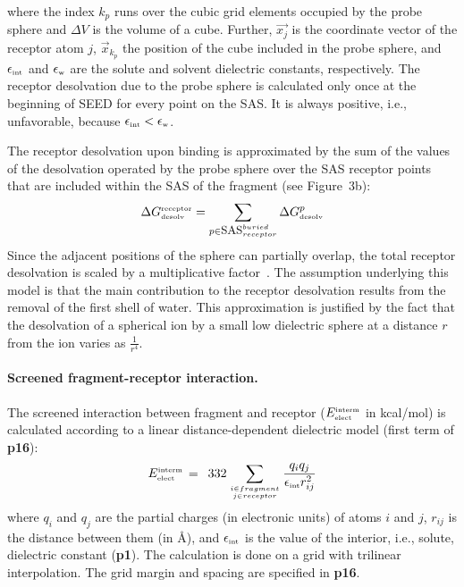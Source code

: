 \documentclass[a4paper,12pt,titlepage]{article}
\begin{document}
%
where the index $k_p$ runs over the cubic grid elements occupied by the probe
sphere and $\Delta V$ is the volume of a cube.  
Further, $\vec{x_j}$ is the coordinate vector of the receptor atom $j$,
$\vec{x}_{k_p}$ the position of the cube included in the probe sphere,
and $\epsilon_{\mbox{\tiny int}}$ and ${\epsilon_{\mbox {\tiny w}}}$ 
are the solute and
solvent dielectric constants, respectively.
The receptor desolvation due to the probe sphere is calculated only once 
at the beginning of SEED for every point on the SAS.  It is always
positive, i.e., unfavorable, because $\epsilon_{\mbox{\tiny int}} 
< {\epsilon_{\mbox {\tiny w}}}$.

The receptor desolvation upon binding
is approximated by the sum of the values of the desolvation operated by the 
probe sphere over the SAS receptor points that are included within the 
SAS of the fragment (see Figure~3b): 
%
\begin{equation}
%
\Delta G^{\mbox{\tiny receptor}}_{\mbox{\tiny desolv}} =
{\sum_{ p \in {\mbox{\small SAS}_{\tiny receptor}^{\tiny buried}} }
 \Delta G^{p}_{\mbox{\tiny desolv}}}
%
\end{equation}
%
Since the adjacent positions of the 
sphere can partially overlap, the total receptor desolvation is scaled by a 
multiplicative factor~\cite{Majeux:Efficient}. 
The assumption underlying this model is that the main contribution to the 
receptor desolvation results from the removal of the first shell of water. 
This approximation is justified by the fact 
that the desolvation of a spherical ion by a small low dielectric sphere at a 
distance $r$ from the ion varies as $\frac{1}{r^4}$.

\paragraph{Screened fragment-receptor interaction.}

The screened interaction between fragment and receptor 
($E^{\mbox{\tiny interm}}_{\mbox{\tiny elect}}$ in kcal/mol)
is calculated according to a linear 
distance-dependent dielectric model (first term of {\bf p16}):
%
\begin{equation}
%
E^{\mbox{\tiny interm}}_{\mbox{\tiny elect}} \, = \, \, \, 
332 \sum_{{i \in fragment} \atop{j \in receptor}} 
\frac{q_i q_j}{\epsilon_{\mbox{\tiny int}} r_{ij}^2} 
\label{eq:int}
%
\end{equation}
%
where $q_i$ and $q_j$ are the partial charges (in electronic units) 
of atoms $i$ and $j$, $r_{ij}$ is 
the distance between them (in \AA), 
and $\epsilon_{\mbox{\tiny int}}$ 
is the value of the interior, i.e., solute, dielectric constant ({\bf p1}). 
The calculation is done on a grid with trilinear interpolation. 
The grid margin and spacing are specified in {\bf p16}.
\end{document}
